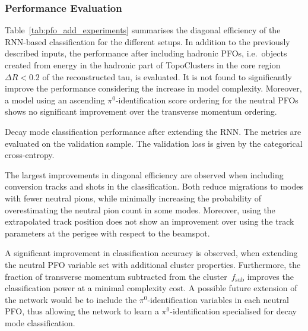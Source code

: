 \subsubsection{Performance Evaluation}

Table~\ref{tab:pfo_add_experiments} summarises the diagonal efficiency of the
RNN-based classification for the different setups. In addition to the previously
described inputs, the performance after including hadronic PFOs, i.e.\ objects
created from energy in the hadronic part of TopoClusters in the core
region~$\Delta R < 0.2$ of the reconstructed tau, is evaluated. It is not found
to significantly improve the performance considering the increase in model
complexity. Moreover, a model using an ascending $\pi^0$-identification score
ordering for the neutral PFOs shows no significant improvement over the
transverse momentum ordering.

\begin{table}[htb]
  \centering
  {\small}
  \caption[Decay mode classification performance after extending the
  model]{Decay mode classification performance after extending the RNN. The
    metrics are evaluated on the validation sample. The validation loss is given
    by the categorical cross-entropy.}
  \label{tab:pfo_add_experiments}
\end{table}

The largest improvements in diagonal efficiency are observed when including
conversion tracks and shots in the classification. Both reduce migrations to
modes with fewer neutral pions, while minimally increasing the probability of
overestimating the neutral pion count in some modes. Moreover, using the
extrapolated track position does not show an improvement over using the track
parameters at the perigee with respect to the beamspot.

A significant improvement in classification accuracy is observed, when extending
the neutral PFO variable set with additional cluster properties. Furthermore,
the fraction of transverse momentum subtracted from the cluster~$f_\text{sub}$
improves the classification power at a minimal complexity cost. A possible
future extension of the network would be to include the $\pi^0$-identification
variables in each neutral PFO, thus allowing the network to learn a
$\pi^0$-identification specialised for decay mode classification.

